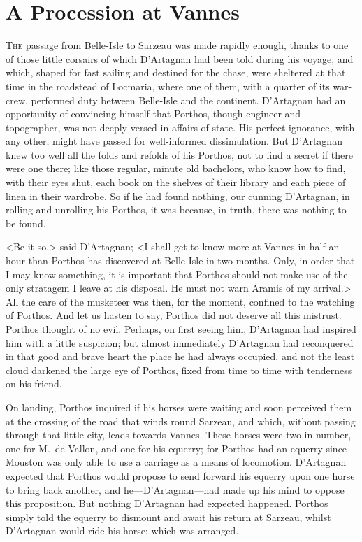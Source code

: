 \chapter{A Procession at Vannes}

\lettrine{T}{he} passage from Belle-Isle to Sarzeau was made rapidly enough, thanks to one of those little corsairs of which D'Artagnan had been told during his voyage, and which, shaped for fast sailing and destined for the chase, were sheltered at that time in the roadstead of Locmaria, where one of them, with a quarter of its war-crew, performed duty between Belle-Isle and the continent. D'Artagnan had an opportunity of convincing himself that Porthos, though engineer and topographer, was not deeply versed in affairs of state. His perfect ignorance, with any other, might have passed for well-informed dissimulation. But D'Artagnan knew too well all the folds and refolds of his Porthos, not to find a secret if there were one there; like those regular, minute old bachelors, who know how to find, with their eyes shut, each book on the shelves of their library and each piece of linen in their wardrobe. So if he had found nothing, our cunning D'Artagnan, in rolling and unrolling his Porthos, it was because, in truth, there was nothing to be found.

<Be it so,> said D'Artagnan; <I shall get to know more at Vannes in half an hour than Porthos has discovered at Belle-Isle in two months. Only, in order that I may know something, it is important that Porthos should not make use of the only stratagem I leave at his disposal. He must not warn Aramis of my arrival.> All the care of the musketeer was then, for the moment, confined to the watching of Porthos. And let us hasten to say, Porthos did not deserve all this mistrust. Porthos thought of no evil. Perhaps, on first seeing him, D'Artagnan had inspired him with a little suspicion; but almost immediately D'Artagnan had reconquered in that good and brave heart the place he had always occupied, and not the least cloud darkened the large eye of Porthos, fixed from time to time with tenderness on his friend.

On landing, Porthos inquired if his horses were waiting and soon perceived them at the crossing of the road that winds round Sarzeau, and which, without passing through that little city, leads towards Vannes. These horses were two in number, one for M.~de Vallon, and one for his equerry; for Porthos had an equerry since Mouston was only able to use a carriage as a means of locomotion. D'Artagnan expected that Porthos would propose to send forward his equerry upon one horse to bring back another, and he—D'Artagnan—had made up his mind to oppose this proposition. But nothing D'Artagnan had expected happened. Porthos simply told the equerry to dismount and await his return at Sarzeau, whilst D'Artagnan would ride his horse; which was arranged.

